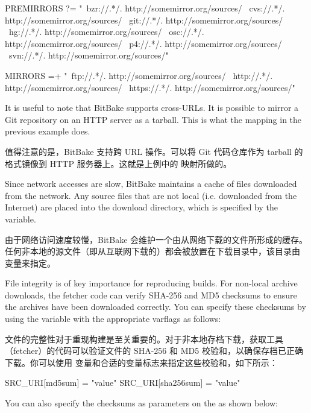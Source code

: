 \begin{pyglist}
PREMIRRORS ?= "\
   bzr://.*/.\*  http://somemirror.org/sources/ \
   cvs://.*/.\*  http://somemirror.org/sources/ \
   git://.*/.\*  http://somemirror.org/sources/ \
   hg://.*/.\*   http://somemirror.org/sources/ \
   osc://.*/.\*  http://somemirror.org/sources/ \
   p4://.*/.\*   http://somemirror.org/sources/ \
  svn://.*/.\*   http://somemirror.org/sources/"

MIRRORS =+ "\
   ftp://.*/.\*   http://somemirror.org/sources/ \
   http://.*/.\*  http://somemirror.org/sources/ \
   https://.*/.\* http://somemirror.org/sources/"
\end{pyglist}

It is useful to note that BitBake supports cross-URLs. It is possible to mirror a Git repository on an HTTP server as a tarball. This is what the  mapping in the previous example does.

值得注意的是，BitBake 支持跨 URL 操作。可以将 Git 代码仓库作为 tarball 的格式镜像到 HTTP 服务器上。这就是上例中的  映射所做的。

Since network accesses are slow, BitBake maintains a cache of files downloaded from the network. Any source files that are not local (i.e. downloaded from the Internet) are placed into the download directory, which is specified by the  variable.

由于网络访问速度较慢，BitBake 会维护一个由从网络下载的文件所形成的缓存。任何非本地的源文件（即从互联网下载的）都会被放置在下载目录中，该目录由  变量来指定。

File integrity is of key importance for reproducing builds. For non-local archive downloads, the fetcher code can verify SHA-256 and MD5 checksums to ensure the archives have been downloaded correctly. You can specify these checksums by using the  variable with the appropriate varflags as follows:

文件的完整性对于重现构建是至关重要的。对于非本地存档下载，获取工具（fetcher）的代码可以验证文件的 SHA-256 和 MD5 校验和，以确保存档已正确下载。你可以使用 \bbgls{SRC_URI} 变量和合适的变量标志来指定这些校验和，如下所示：

\begin{pyglist}
SRC_URI[md5sum] = "value"
SRC_URI[sha256sum] = "value"
\end{pyglist}

You can also specify the checksums as parameters on the  as shown below:

